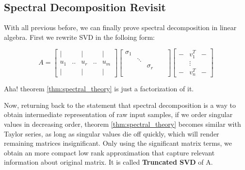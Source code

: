\documentclass[a4paper]{book}
\begin{document}
      \subsection{Spectral Decomposition Revisit}

      With all previous before, we can finally prove spectral decomposition in
      linear algebra. First we rewrite SVD in the folloing form:

      \begin{displaymath}
        A
        =
        \begin{bmatrix}
            |   &    &   |   &    &   |  \\
          u_{1} & .. & u_{r} & .. & u_{m}\\
            |   &    &   |   &    &   |  
        \end{bmatrix}
        \begin{bmatrix}
          \sigma_{1}  &         &       &    &      \\
                      & \ddots  &       &    &      \\
                      &         & \sigma_{r} &    & \\
                      &         &            &    & \\
        \end{bmatrix}
        \begin{bmatrix}
            -   & v_{1}^{T}   & - \\
                & \vdots      &  \\
            -   & v_{n}^{T}   & - 
        \end{bmatrix}
      \end{displaymath}

      Aha! theorem \ref{thm:spectral_theory} is just a factorization of
      it.

      Now, returning back to the statement that spectral decomposition
      is a way to obtain intermediate representation of raw input
      samples, if we order singular values in decreasing order, theorem
      \ref{thm:spectral_theory} becomes similar with Taylor series, as
      long as singular values die off quickly, which will render
      remaining matrices insignificant. Only using the significant
      matrix terms, we obtain an more compact low rank approximation
      that capture relevant information about original matrix. It is
      called \textbf{Truncated SVD} of A.
\end{document}
